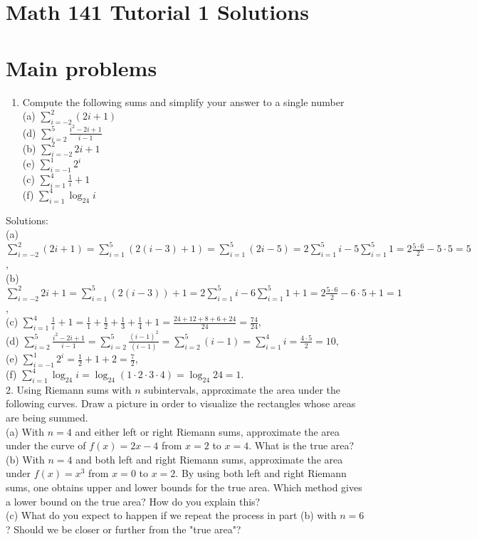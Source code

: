 \documentclass[10pt]{article}
\begin{document}
\section*{Math 141 Tutorial 1 Solutions}
\section*{Main problems}
\begin{enumerate}
  \item Compute the following sums and simplify your answer to a single number\\
(a) $\sum_{i=-2}^{2}(2 i+1)$\\
(d) $\sum_{i=2}^{5} \frac{i^{2}-2 i+1}{i-1}$\\
(b) $\sum_{i=-2}^{2} 2 i+1$\\
(e) $\sum_{i=-1}^{1} 2^{i}$\\
(c) $\sum_{i=1}^{4} \frac{1}{i}+1$\\
(f) $\sum_{i=1}^{4} \log _{24} i$
\end{enumerate}

Solutions:\\
(a) $\sum_{i=-2}^{2}(2 i+1)=\sum_{i=1}^{5}(2(i-3)+1)=\sum_{i=1}^{5}(2 i-5)=2 \sum_{i=1}^{5} i-5 \sum_{i=1}^{5} 1=2 \frac{5 \cdot 6}{2}-5 \cdot 5=5$,\\
(b) $\sum_{i=-2}^{2} 2 i+1=\sum_{i=1}^{5}(2(i-3))+1=2 \sum_{i=1}^{5} i-6 \sum_{i=1}^{5} 1+1=2 \frac{5 \cdot 6}{2}-6 \cdot 5+1=1$,\\
(c) $\sum_{i=1}^{4} \frac{1}{i}+1=\frac{1}{1}+\frac{1}{2}+\frac{1}{3}+\frac{1}{4}+1=\frac{24+12+8+6+24}{24}=\frac{74}{24}$,\\
(d) $\sum_{i=2}^{5} \frac{i^{2}-2 i+1}{i-1}=\sum_{i=2}^{5} \frac{(i-1)^{2}}{(i-1)}=\sum_{i=2}^{5}(i-1)=\sum_{i=1}^{4} i=\frac{4 \cdot 5}{2}=10$,\\
(e) $\sum_{i=-1}^{1} 2^{i}=\frac{1}{2}+1+2=\frac{7}{2}$,\\
(f) $\sum_{i=1}^{4} \log _{24} i=\log _{24}(1 \cdot 2 \cdot 3 \cdot 4)=\log _{24} 24=1$.\\
2. Using Riemann sums with $n$ subintervals, approximate the area under the following curves. Draw a picture in order to visualize the rectangles whose areas are being summed.\\
(a) With $n=4$ and either left or right Riemann sums, approximate the area under the curve of $f(x)=2 x-4$ from $x=2$ to $x=4$. What is the true area?\\
(b) With $n=4$ and both left and right Riemann sums, approximate the area under $f(x)=x^{3}$ from $x=0$ to $x=2$. By using both left and right Riemann sums, one obtains upper and lower bounds for the true area. Which method gives a lower bound on the true area? How do you explain this?\\
(c) What do you expect to happen if we repeat the process in part (b) with $n=6$ ? Should we be closer or further from the "true area"?
\end{document}
